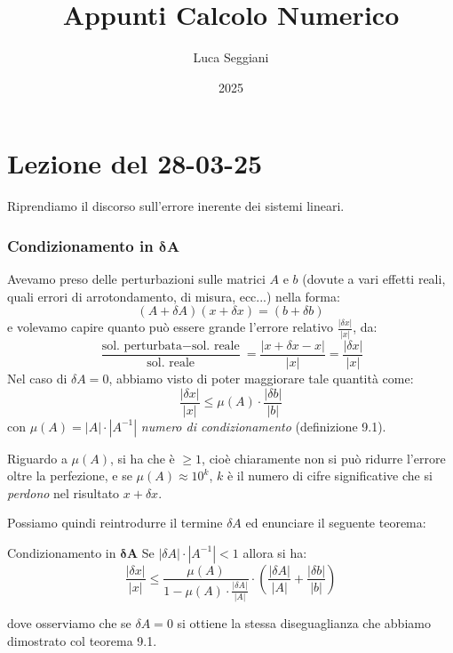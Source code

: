 \documentclass[a4paper,11pt]{article}
\title{Appunti Calcolo Numerico}
\author{Luca Seggiani}
\date{2025}
\begin{document}
\section{Lezione del 28-03-25}

\thispagestyle{empty}
\pagestyle{fancy}

Riprendiamo il discorso sull'errore inerente dei sistemi lineari.

\subsubsection{Condizionamento in $\mathbf{ \delta A}$}
Avevamo preso delle perturbazioni sulle matrici $A$ e $b$ (dovute a vari effetti reali, quali errori di arrotondamento, di misura, ecc...) nella forma:
$$
(A + \delta A) (x + \delta x) = (b + \delta b)
$$
e volevamo capire quanto può essere grande l'errore relativo $\frac{|\delta x|}{|x|}$, da:
$$
\frac{ \text{sol. perturbata} - \text{sol. reale} }{ \text{sol. reale} } = \frac{|x + \delta x - x|}{|x|} = \frac{|\delta x|}{|x|}
$$
Nel caso di $\delta A = 0$, abbiamo visto di poter maggiorare tale quantità come:
$$
\frac{|\delta x|}{|x|} \leq \mu(A) \cdot \frac{|\delta b|}{|b|}
$$
con $\mu(A) = |A| \cdot |A^{-1}|$ \textit{numero di condizionamento} (definizione 9.1).

Riguardo a $\mu(A)$, si ha che è $\geq 1$, cioè chiaramente non si può ridurre l'errore oltre la perfezione, e se $\mu(A) \approx 10^{k}$, $k$ è il numero di cifre significative che si \textit{perdono} nel risultato $x + \delta x$.

Possiamo quindi reintrodurre il termine $\delta A$ ed enunciare il seguente teorema:
\begin{theorem}{Condizionamento in $\mathbf{ \delta A }$}
	Se $|\delta A| \cdot |A^{-1}| < 1$ allora si ha:
	$$
	\frac{| \delta x|}{|x|} \leq \frac{\mu(A)}{1 - \mu(A) \cdot \frac{ |\delta A| }{|A|}} \cdot \left( \frac{|\delta A|}{|A|} + \frac{|\delta b|}{|b|} \right)
	$$
\end{theorem}
dove osserviamo che se $\delta A = 0$ si ottiene la stessa diseguaglianza che abbiamo dimostrato col teorema 9.1.
\end{document}
